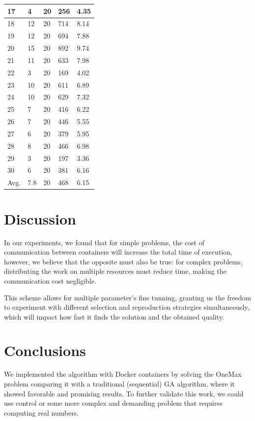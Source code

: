 \documentclass[runningheads]{llncs}
\begin{document}
\begin{table}[]
\begin{tabular}{|l|l|l|l|l|}
        17 & 4 & 20 & 256 & 4.35 \\ \hline
        18 & 12 & 20 & 714 & 8.14 \\ \hline
        19 & 12 & 20 & 694 & 7.88 \\ \hline
        20 & 15 & 20 & 892 & 9.74 \\ \hline
        21 & 11 & 20 & 633 & 7.98 \\ \hline
        22 & 3 & 20 & 169 & 4.02 \\ \hline
        23 & 10 & 20 & 611 & 6.89 \\ \hline
        24 & 10 & 20 & 629 & 7.32 \\ \hline
        25 & 7 & 20 & 416 & 6.22 \\ \hline
        26 & 7 & 20 & 446 & 5.55 \\ \hline
        27 & 6 & 20 & 379 & 5.95 \\ \hline
        28 & 8 & 20 & 466 & 6.98 \\ \hline
        29 & 3 & 20 & 197 & 3.36 \\ \hline
        30 & 6 & 20 & 381 & 6.16 \\ \hline
        Avg. & 7.8 & 20 & 468 & 6.15 \\ \hline
        \end{tabular}
        \end{table}

\section{Discussion}

In our experiments, we found that for simple problems, the cost of
communication between containers will increase the total time of execution,
however, we believe that the opposite must also be true: for complex problems,
distributing the work on multiple resources must reduce time, making the
communication cost negligible.

This scheme allows for multiple parameter's fine tunning, granting us the
freedom to experiment with different selection and reproduction strategies
simultaneously, which will impact how fast it finds the solution and the
obtained quality.

\section{Conclusions}

We implemented the algorithm with Docker containers by solving the OneMax
problem comparing it with a traditional (sequential) GA algorithm, where it
showed favorable and promising results. To further validate this work, we could
use control or some more complex and demanding problem that requires computing
real numbers.
\end{document}
